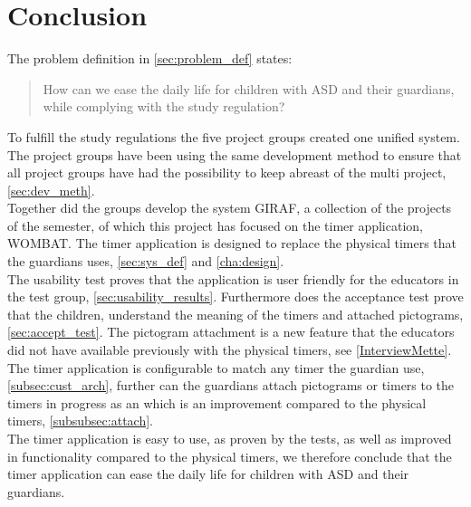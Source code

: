 \chapter{Conclusion}
The problem definition in \autoref{sec:problem_def} states:

\begin{quotation}
How can we ease the daily life for children with ASD and their guardians, while complying with the study regulation? 
\end{quotation}

To fulfill the study regulations the five project groups created one unified system.
The project groups have been using the same development method to ensure that all project groups have had the possibility to keep abreast of the multi project, \autoref{sec:dev_meth}.\\

Together did the groups develop the system GIRAF, a collection of the projects of the semester, of which this project has focused on the timer application, WOMBAT.
The timer application is designed to replace the physical timers that the guardians uses, \autoref{sec:sys_def} and \autoref{cha:design}.\\

The usability test proves that the application is user friendly for the educators in the test group, \autoref{sec:usability_results}.
Furthermore does the acceptance test prove that the children, understand the meaning of the timers and attached pictograms, \autoref{sec:accept_test}. 
The pictogram attachment is a new feature that the educators did not have available previously with the physical timers, see \autoref{InterviewMette}.\\

The timer application is configurable to match any timer the guardian use, \autoref{subsec:cust_arch}, further can the guardians attach pictograms or timers to the timers in progress as an which is an improvement compared to the physical timers, \autoref{subsubsec:attach}.\\ 

The timer application is easy to use, as proven by the tests, as well as improved in functionality compared to the physical timers, we therefore conclude that the timer application can ease the daily life for children with ASD and their guardians.\\



